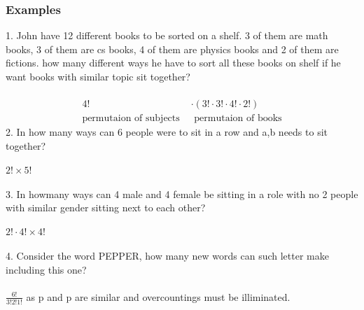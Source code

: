 \documentclass{article}
\begin{document}
\subsubsection*{Examples}
1. John have 12 different books to be sorted on a shelf. 3 of them are math books, 3 of them are cs books, 4 of them are physics books and 2 of them are fictions.
how many different ways he have to sort all these books on shelf if he want books with similar topic sit together?
\\ \\
\begin{align*}
    4!&\cdot(3!\cdot3!\cdot4!\cdot2!)\\
    \text{permutaion of subjects }&\text{ permutaion of books}
\end{align*}
2. In how many ways can 6 people were to sit in a row and a,b needs to sit together?
\\ \\ 
\(2! \times 5!\)
\\ \\ 
3. In howmany ways can 4 male and 4 female be sitting in a role with no 2 people with similar gender sitting next to each other?
\\ \\ 
\(2!\cdot 4!\times 4!\)
\\ \\
4. Consider the word PEPPER, how many new words can such letter make including this one?
\\ \\
\(\frac{6!}{3!2!1!}\)
as p and p are similar and overcountings must be illiminated.
\end{document}
